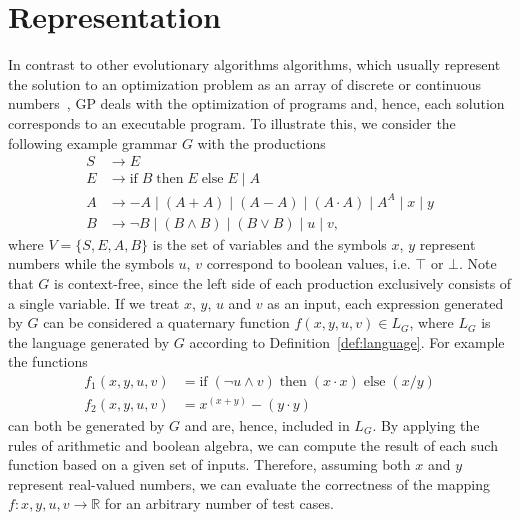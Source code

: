 \section{Representation}
In contrast to other evolutionary algorithms algorithms, which usually represent the solution to an optimization problem as an array of discrete or continuous numbers~\cite{back1997handbook}, GP deals with the optimization of programs and, hence, each solution corresponds to an executable program.
To illustrate this, we consider the following example grammar $G$ with the productions
\begin{equation}
	\begin{split}
		S & \to E \\
		E & \to \text{if} \; B \; \text{then} \; E \; \text{else} \; E \; | \; A \\
		A & \to -A \; | \; (A + A) \; | \; (A - A) \; | \; (A \cdot A) \; | \; A^A \; | \; x \; | \; y \\  
		B & \to \neg B \; | \; (B \wedge B) \; | \; (B \vee B) \; | \; u \; | \; v,
	\end{split}
\label{eq:gp-example-grammar}
\end{equation}
where $V = \{S, E, A, B\}$ is the set of variables and the symbols $x$, $y$ represent numbers while the symbols $u$, $v$ correspond to boolean values, i.e. $\top$ or $\bot$.
Note that $G$ is context-free, since the left side of each production exclusively consists of a single variable.
If we treat $x$, $y$, $u$ and $v$ as an input, each expression generated by $G$ can be considered a quaternary function $f(x,y,u,v) \in L_{G}$, where $L_G$ is the language generated by $G$ according to Definition~\ref{def:language}.
For example the functions
\begin{equation}
	\begin{split}
		f_1(x,y,u,v) & = \text{if} \; (\neg u \wedge v) \; \text{then} \; (x \cdot x) \; \text{else} \; (x / y) \\
		f_2(x,y,u,v) & = x^{(x + y)} - (y \cdot y)
	\end{split}
\label{eq:gp-example-functions}
\end{equation} can both be generated by $G$ and are, hence, included in $L_G$.
By applying the rules of arithmetic and boolean algebra, we can compute the result of each such function based on a given set of inputs.
Therefore, assuming both $x$ and $y$ represent real-valued numbers, we can evaluate the correctness of the mapping $f : x, y, u, v \to \mathbb{R}$ for an arbitrary number of test cases.
